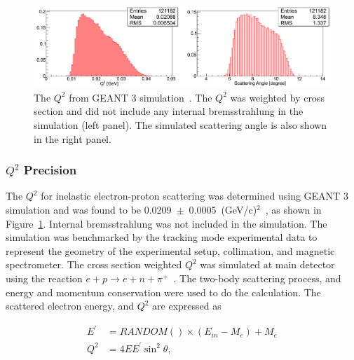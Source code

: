 \begin{figure}[!h]
	\begin{center}
	\includegraphics[width=15.0cm]{figures/inelastic_Q2}
	\end{center}
	\caption
	{The $Q^{2}$ from GEANT 3 simulation~\cite{elog:nur_ancillary44}. The $Q^{2}$ was weighted by cross section and did not include any internal bremsstrahlung in the simulation (left panel). The simulated scattering angle is also shown in the right panel.}
	\label{fig:inelastic_Q2}
\end{figure}

\subsubsection{$Q^{2}$ Precision}
\label{Q2 Precision}

The $Q^{2}$ for inelastic electron-proton scattering was determined using GEANT 3 simulation and was found to be 0.0209~$\pm$~0.0005~(GeV/c)$^{2}$~\cite{elog:nur_ancillary44}, as shown in Figure~\ref{fig:inelastic_Q2}. Internal bremsstrahlung was not included in the simulation. The simulation was benchmarked by the tracking mode experimental data to represent the geometry of the experimental setup, collimation, and magnetic spectrometer.
The cross section weighted $Q^{2}$ was simulated at main detector using the reaction $e + p \rightarrow e + n + \pi^{+}$~\cite{elog:nur_ancillary44}. The two-body scattering process, and energy and momentum conservation were used to do the calculation. The scattered electron energy, and $Q^{2}$ are expressed as 

\begin{equation} \label{equ:eqQ2Calculation}
\begin{split}
E^{\prime} &= RANDOM()\times(E_{in} - M_{e}) + M_{e} \\
Q^{2} &= 4EE^{\prime}\sin^{2}\theta,
\end{split}
\end{equation}

